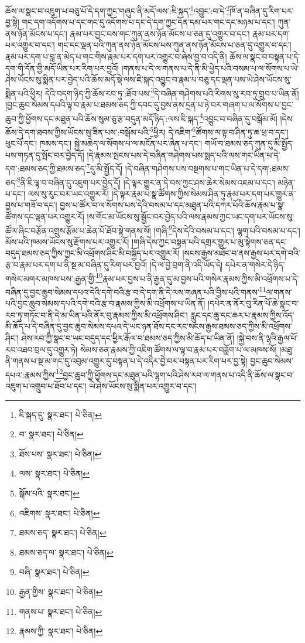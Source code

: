 ཆོས་ལ་སྣང་བ་འཇུག་པ་བཅུ་པོ་དེ་དག་ཀྱང་གཞུང་ནི་མདོ་ལས་:ཇི་སྐད་\footnote{ཇི་སྐད་དུ་  སྣར་ཐང་།  པེ་ཅིན། }འབྱུང་:བ་དེ་\footnote{བ་  སྣར་ཐང་།  པེ་ཅིན། }ཁོ་ན་བཞིན་དུ་རིག་པར་བྱ་སྟེ། གང་དག་འདོགས་པ་དང་གང་དུ་འདོགས་པ་དང་དེ་དག་ཀྱང་དོན་དམ་པར་གང་དང་མཉམ་པ་དང་། ཀུན་ནས་ཉོན་མོངས་པ་དང་། རྣམ་པར་བྱང་བས་གང་ཀུན་ནས་ཉོན་མོངས་པ་ཅན་དུ་འགྱུར་བ་དང་། རྣམ་པར་དག་པར་འགྱུར་བ་དང་། གང་དང་ལྡན་པའི་ཀུན་ནས་ཉོན་མོངས་པས་ཀུན་ནས་ཉོན་མོངས་པ་ཅན་དུ་འགྱུར་བ་དང་། རྣམ་པར་དག་པ་བླ་ན་མེད་པ་གང་གིས་རྣམ་པར་དག་པར་འགྱུར་བ་ཞེས་བྱ་བ་འདི་ནི། ཆོས་ལ་སྣང་བ་བསྟན་པ་དེ་དག་གི་དོན་གྱི་མདོ་ཡིན་པར་རིག་པར་བྱའོ། །གནས་པ་དེ་ལ་གནས་པ་དེ་ནི་མི་ཕྱེད་པའི་བསམ་པ་ལ་སོགས་པ་ཡེ་ཤེས་ཡོངས་སུ་སྨིན་པར་བྱེད་པའི་ཆོས་མདོ་སྡེ་ལས་ཇི་སྐད་འབྱུང་བ་རྣམ་པ་བཅུ་དང་ལྡན་པས་ཡེ་ཤེས་ཡོངས་སུ་སྨིན་པའི་ཕྱིར། དེའི་བདག་ཉིད་ཀྱི་ཆོས་རབ་ཏུ་:ཐོབ་པས་\footnote{ཐོས་པས་  སྣར་ཐང་།  པེ་ཅིན། }དེ་བཞིན་གཤེགས་པའི་རིགས་སུ་རབ་ཏུ་གྲུབ་པ་ཡིན་ནོ། །བྱང་ཆུབ་སེམས་དཔའི་ལྟ་བ་རྣམ་པ་ཐམས་ཅད་ཀྱི་དབང་དུ་བྱས་ནས་དྲན་པ་ཉེ་བར་གཞག་པ་ལ་སོགས་པ་བྱང་ཆུབ་ཀྱི་ཕྱོགས་དང་མཐུན་པའི་ཆོས་སུམ་ཅུ་རྩ་བདུན་མདོ་ཉིད་:ལས་ཇི་སྐད་\footnote{ལས་  སྣར་ཐང་།  པེ་ཅིན། }འབྱུང་བ་བཞིན་དུ་བསྒོམ་མོ། །དེས་ཆོས་དེ་དག་ཐབས་ཀྱིས་ཡོངས་སུ་ཟིན་པས་:བསྒོམ་པའི་\footnote{སྒོམ་པའི་  སྣར་ཐང་། }ཕྱིར། དེ་འཇིག་\footnote{འཇིགས་  སྣར་ཐང་།  པེ་ཅིན། }ཚོགས་ལ་ལྟ་བ་ཤིན་ཏུ་ཆ་ཕྲ་བ་དང་། ཕུང་པོ་དང་། ཁམས་དང་། སྐྱེ་མཆེད་ལ་སོགས་པ་ལ་མངོན་པར་ཞེན་པ་དང་། གཡོ་བ་ཐམས་ཅད་ཀུན་དུ་མི་སྤྱོད་པས་གཏན་དུ་སྤོང་བར་བྱེད་དོ། །དེ་རྣམས་སྤངས་པས་དེ་བཞིན་གཤེགས་པས་སྨད་པའི་ལས་གང་ཡིན་པ་དེ་དག་:ཐམས་ཅད་ཀྱི་ཐམས་ཅད་\footnote{ཐམས་ཅད་  སྣར་ཐང་།  པེ་ཅིན། }དུ་མི་སྤྱོད་དོ། །དེ་བཞིན་གཤེགས་པས་བསྔགས་པ་གང་ཡིན་པ་དེ་དག་:ཐམས་ཅད་\footnote{ཐམས་ཅད་ལ་  སྣར་ཐང་།  པེ་ཅིན། }ནི་ཇི་ལྟ་བ་བཞིན་དུ་འཇུག་པར་བྱེད་དོ། །དེ་ལྟར་གྱུར་ན་དེ་བས་ཀྱང་ཤས་ཆེར་སེམས་འཇམ་པ་དང་། མཉེན་པ་དང་། ལས་སུ་རུང་བར་ཡང་འགྱུར་རོ། །དེ་ལྟར་རྣམ་པ་སྣ་ཚོགས་ཀྱིས་སེམས་ཤིན་ཏུ་རྣམ་པར་དག་པར་གྱུར་ན་བྱས་པ་གཟོ་བ་དང་། བྱས་པ་ཚོར་བ་ལ་སོགས་པས་དེའི་བསམ་པ་དང་མཐུན་པའི་དཀར་པོའི་ཆོས་རྣམ་པ་སྣ་ཚོགས་དང་ལྡན་པར་འགྱུར་རོ། །ས་གོང་མ་ཡོངས་སུ་སྦྱོང་བར་བྱེད་པའི་ལས་རྣམས་ཀྱང་ཡང་དག་པར་ཡོངས་སུ་ཚོལ་ཞིང་བརྩོན་འགྲུས་རྩོམ་པ་ཆེན་པོ་ཐོབ་སྟེ་གནས་སོ། །གཞི་\footnote{བཞི་  སྣར་ཐང་།  པེ་ཅིན། }དེས་དེའི་བསམ་པ་དང་། ལྷག་པའི་བསམ་པ་དང་། མོས་པའི་ཁམས་ཡོངས་སུ་རྫོགས་པར་འགྱུར་རོ། །གཞི་དེས་ཀྱང་བསྟན་པའི་དགྲར་གྱུར་པ་མུ་སྟེགས་ཅན་དང་བདུད་ཐམས་ཅད་ཀྱིས་ཀྱང་མི་འཕྲོགས་ཤིང་མི་བསྐྱོད་པར་འགྱུར་རོ། །སངས་རྒྱས་མཐོང་བ་ནས་རྒྱས་པར་དགེ་བའི་རྩ་བ་རྣམ་པར་དག་པ་ནི་སྔ་མ་བཞིན་དུ་རིག་པར་བྱའོ། །དེ་ལ་བྱེ་བྲག་ནི་འདི་ཡོད་དེ། དཔེར་ན་གསེར་དེ་ཉིད་གསེར་མགར་མཁས་པས་:རྒྱན་གྱི་\footnote{རྒྱན་གྱིས་  སྣར་ཐང་།  པེ་ཅིན། }རྣམ་པར་བྱས་པ་ནི་རྒྱན་དུ་མ་བྱས་པའི་གསེར་རྣམས་ཀྱིས་མི་འཕྲོགས་པ་དེ་བཞིན་དུ་བྱང་ཆུབ་སེམས་དཔའ་དེའི་དགེ་བའི་རྩ་བ་དེ་དག་ནི་དེ་ལས་གཞན་པའི་བྱིས་པའི་གནས་\footnote{གནས་པ་  སྣར་ཐང་།  པེ་ཅིན། }ལ་གནས་པའི་བྱང་ཆུབ་སེམས་དཔའི་དགེ་བའི་རྩ་བ་རྣམས་ཀྱིས་མི་འཕྲོགས་པ་ཡིན་ནོ། །དཔེར་ན་ནོར་བུ་རིན་པོ་ཆེ་སྣང་བ་རབ་ཏུ་གཏོང་བ་ནི་དེ་མ་ཡིན་པའི་ནོར་བུ་རྣམས་ཀྱིས་མི་འཕྲོགས་ཤིང་། རླུང་དང་ཆུ་དང་ཆར་པ་རྣམས་ཀྱིས་འོད་མི་ཆོད་པ་དེ་བཞིན་དུ་བྱང་ཆུབ་སེམས་དཔའ་དེ་ཡང་ཉན་ཐོས་དང་རང་སངས་རྒྱས་ཐམས་ཅད་ཀྱིས་མི་འཕྲོགས་ཤིང་། ཤེས་རབ་ཀྱི་སྣང་བ་ཡང་བདུད་དང་ཕྱིར་རྒོལ་བ་ཐམས་ཅད་ཀྱིས་མི་ཆོད་པ་ཡིན་ནོ། །སྐྱེ་བས་ནི་ལྷའི་རྒྱལ་པོ་རབ་འཐབ་བྲལ་དུ་འགྱུར་ཏེ། སེམས་ཅན་རྣམས་ཀྱི་འཇིག་ཚོགས་ལ་ལྟ་བ་རྣམ་པར་བཟློག་པ་ལ་མཁས་སོ། །མཐུ་ནི་གནས་པ་སྔ་མ་གང་དུ་འབུམ་འགྱུར་དུ་བསྟན་པ་དེ་འདིར་བྱེ་བར་བསྟན་པར་རིག་པར་བྱ་སྟེ། བྱང་ཆུབ་སེམས་དཔའ་:རྣམས་ཀྱིས་\footnote{རྣམས་ཀྱི་  སྣར་ཐང་།  པེ་ཅིན། }བྱང་ཆུབ་ཀྱི་ཕྱོགས་དང་མཐུན་པའི་ལྷག་པའི་ཤེས་རབ་ལ་གནས་པ་འདི་ནི་ཆོས་ལ་སྣང་བ་འཇུག་པ་འགྲུབ་པ་ཐོབ་པ་དང་། ཡེ་ཤེས་ཡོངས་སུ་སྨིན་པར་འགྱུར་བ་དང་། 
